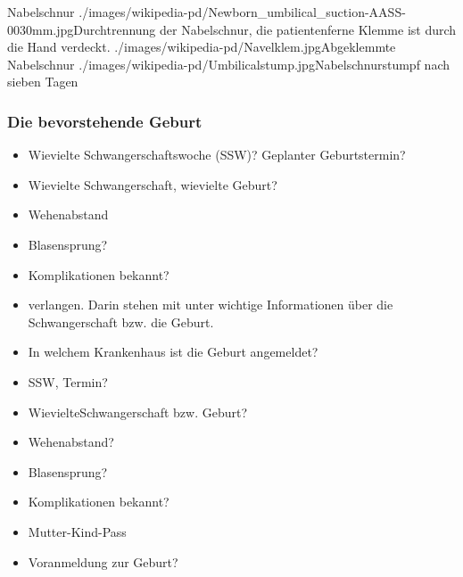 

\begin{PictureSeriesWide}{}{Nabelschnur}
{./images/wikipedia-pd/Newborn_umbilical_suction-AASS-0030mm.jpg}{Durchtrennung der Nabelschnur, die patientenferne Klemme ist durch die Hand verdeckt. }
{./images/wikipedia-pd/Navelklem.jpg}{Abgeklemmte Nabelschnur }
{./images/wikipedia-pd/Umbilicalstump.jpg}{Nabelschnurstumpf nach sieben Tagen }
{}{}
\end{PictureSeriesWide}



\subsubsection{Die bevorstehende Geburt}


{%
\begin{itemize}
  \item Wievielte Schwangerschaftswoche
  (SSW)? Geplanter Geburtstermin?
  \item Wievielte Schwangerschaft,
  wievielte Geburt? 
  \item Wehenabstand
  \item Blasensprung? 
  \item Komplikationen bekannt?
  \item {} verlangen. Darin stehen mit
  unter wichtige Informationen über die Schwangerschaft bzw. die  Geburt.
  \item In welchem Krankenhaus ist die Geburt
  angemeldet?
\end{itemize}
}{
\begin{itemize}
  \item SSW, Termin?
  \item WievielteSchwangerschaft bzw. Geburt?
  \item Wehenabstand?
  \item Blasensprung?
  \item Komplikationen bekannt?
  \item Mutter-Kind-Pass
  \item Voranmeldung zur Geburt?
\end{itemize}
}{}{}{}
  
